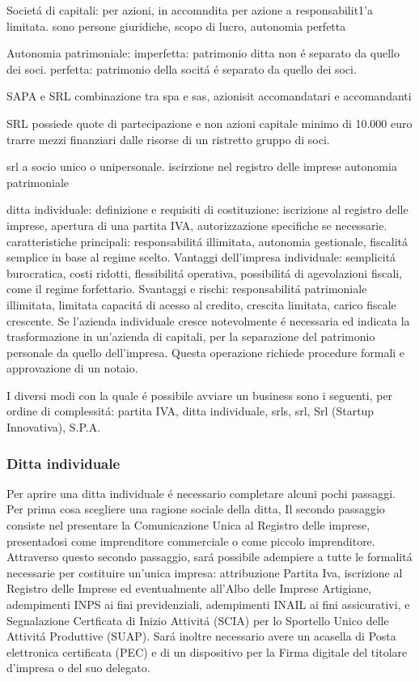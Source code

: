\documentclass{article}
\begin{document}
Societ\'a di capitali:
per azioni, in accomndita per azione
a responsabilit1'a limitata.
sono persone giuridiche, scopo di lucro, autonomia perfetta


Autonomia patrimoniale: 
imperfetta: patrimonio ditta non \'e separato da quello dei soci.
perfetta: patrimonio della socit\'a \'e separato da quello dei soci. 


SAPA e SRL
combinazione tra spa e sas, azionisit accomandatari e accomandanti

SRL
possiede quote di partecipazione e non azioni
capitale minimo di 10.000 euro
trarre mezzi finanziari dalle risorse di un ristretto gruppo di soci. 

srl a socio unico o unipersonale.
iscirzione nel registro delle imprese
autonomia patrimoniale

ditta individuale:
definizione e requisiti di costituzione: iscrizione al registro delle imprese, apertura di una partita IVA, autorizzazione specifiche se necessarie.
caratteristiche principali: responsabilit\'a illimitata, autonomia gestionale, fiscalit\'a semplice in base al regime scelto.
Vantaggi dell'impresa individuale: semplicit\'a burocratica, costi ridotti, flessibilit\'a operativa, possibilit\'a di agevolazioni fiscali, come il regime forfettario.
Svantaggi e rischi: responsabilit\'a patrimoniale illimitata, limitata capacit\'a di acesso al credito, crescita limitata, carico fiscale crescente. 
Se l'azienda individuale cresce notevolmente \'e necessaria ed indicata la trasformazione in un'azienda di capitali, per la separazione del patrimonio personale da quello dell'impresa. Questa operazione richiede procedure formali e approvazione di un notaio.

I diversi modi con la quale \'e possibile avviare un business sono i seguenti, per ordine di complessit\'a:
partita IVA, ditta individuale, srls, srl, Srl (Startup Innovativa), S.P.A.


\subsubsection{Ditta individuale}
Per aprire una ditta individuale \'e necessario completare alcuni pochi passaggi. Per prima cosa scegliere una ragione sociale della ditta,
Il secondo passaggio consiste nel presentare la Comunicazione Unica al Registro delle imprese, presentadosi come imprenditore commerciale o come piccolo imprenditore.
Attraverso questo secondo passaggio, sar\'a possibile adempiere a tutte le formalit\'a necessarie per costituire un'unica impresa: attribuzione Partita Iva, iscrizione al Registro delle Imprese ed eventualmente all'Albo delle Imprese Artigiane,
adempimenti INPS ai fini previdenziali, adempimenti INAIL ai fini assicurativi, e Segnalazione Certficata di Inizio Attivit\'a (SCIA) per lo Sportello Unico delle Attivit\'a Produttive (SUAP).
Sar\'a inoltre necessario avere un acasella di Posta elettronica certificata (PEC) e di un dispositivo per la Firma digitale del titolare d'impresa o del suo delegato.
\end{document}
